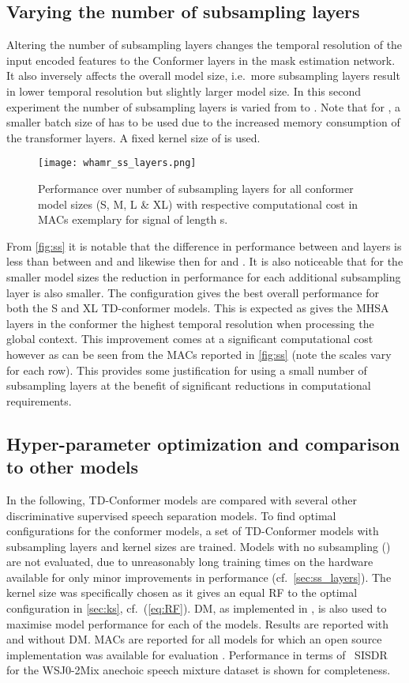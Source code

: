 \subsection{Varying the number of subsampling layers}\label{sec:ss_layers}
Altering the number of subsampling layers changes the temporal resolution of the input encoded features to the Conformer layers in the mask estimation network. It also inversely affects the overall model size, i.e.~more subsampling layers result in lower temporal resolution but slightly larger model size. In this second experiment 
the number of subsampling layers  is varied from  to . Note that for , a smaller batch size of  has to be used due to the increased memory consumption of the transformer layers. A fixed kernel size of  is used.
\begin{figure}[!ht]
    \centering
    \texttt{[image: whamr\_ss\_layers.png]}
    \caption{Performance over number of  subsampling layers  for all conformer model sizes (S, M, L \& XL) with respective computational cost in \ac{MACs} exemplary for signal of length s.}
    \label{fig:ss}
\end{figure}
From \autoref{fig:ss} it is notable that the difference in performance between  and  layers is less than between  and  and likewise then for  and . It is also noticeable that for the smaller model sizes the reduction in performance for each additional subsampling layer is also smaller.
The  configuration gives the best overall performance for both the S and XL TD-conformer models. This is expected as  gives the \ac{MHSA} layers in the conformer the highest temporal resolution when processing the global context. This improvement comes at a significant computational cost however as can be seen from the \ac{MACs} reported in \autoref{fig:ss} (note the scales vary for each row). This provides some justification for using a small number of subsampling layers at the benefit of significant reductions in computational requirements. 


\subsection{Hyper-parameter optimization and comparison to other models}\label{sec:results:final}
In the following, TD-Conformer models are compared with several other discriminative supervised speech separation models. To find optimal configurations for the conformer models, a set of TD-Conformer models with  subsampling layers and kernel sizes  are trained. Models with no subsampling  () are not evaluated, due to unreasonably long training times on the hardware available for only minor improvements in performance (cf.~\autoref{sec:ss_layers}). The kernel size  was specifically chosen as it gives an equal \ac{RF} to the optimal configuration  in  \autoref{sec:ks}, cf.~(\ref{eq:RF}). \Ac{DM}, as implemented in \cite{wavesplit}, is also used to maximise model performance for each of the models. Results are reported with and without \ac{DM}.
 \Ac{MACs} are reported for all models for which an open source implementation was available for evaluation \cite{convtasnet,sudormrf,deformtcn,sepformer}. 
Performance in terms of ~SISDR for the WSJ0-2Mix anechoic speech mixture dataset \cite{Isik} is shown for completeness.

